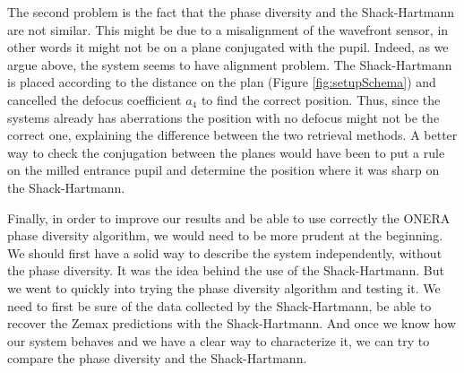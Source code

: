 The second problem is the fact that the phase diversity and the Shack-Hartmann are not similar. This might be due to a misalignment of the wavefront sensor, in other words it might not be on a plane conjugated with the pupil. Indeed, as we argue above, the system seems to have alignment problem. The Shack-Hartmann is placed according to the distance on the plan (Figure \ref{fig:setupSchema}) and cancelled the defocus coefficient $a_4$ to find the correct position. Thus, since the systems already has aberrations the position with no defocus might not be the correct one, explaining the difference between the two retrieval methods. A better way to check the conjugation between the planes would have been to put a rule on the milled entrance pupil and determine the position where it was sharp on the Shack-Hartmann. 

Finally, in order to improve our results and be able to use correctly the ONERA phase diversity algorithm, we would need to be more prudent at the beginning. We should first have a solid way to describe the system independently, without the phase diversity. It was the idea behind the use of the Shack-Hartmann. But we went to quickly into trying the phase diversity algorithm and testing it. We need to first be sure of the data collected by the Shack-Hartmann, be able to recover the Zemax predictions with the Shack-Hartmann. And once we know how our system behaves and we have a clear way to characterize it, we can try to compare the phase diversity and the Shack-Hartmann.
